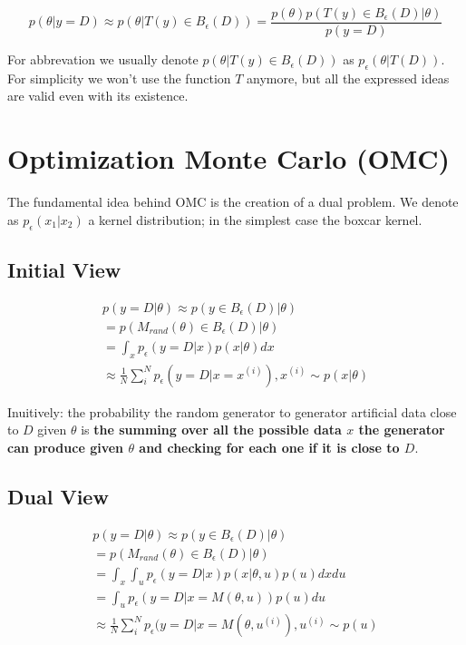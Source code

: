 \documentclass{article}
\begin{document}
\begin{equation} \label{eq:summary_stat}
    p(\theta|y=D) \approx p(\theta|T(y) \in B_\epsilon(D)) = \frac{p(\theta) p(T(y) \in B_\epsilon(D)|\theta)}{p(y=D)}
\end{equation}

For abbrevation we usually denote $p(\theta|T(y) \in B_\epsilon(D))$ as $p_\epsilon(\theta|T(D))$. For simplicity we won't use the function $T$ anymore, but all the expressed ideas are valid even with its existence.


\section{Optimization Monte Carlo (OMC)}

The fundamental idea behind OMC is the creation of a dual problem. We denote as $p_\epsilon(x_1|x_2)$ a kernel distribution; in the simplest case the boxcar kernel. 

\subsection*{Initial View}

\begin{gather} \label{eq:init_view}
  p(y=D|\theta) \approx p(y \in B_\epsilon (D)|\theta) \\
  = p(M_{rand}(\theta) \in B_\epsilon (D)|\theta)\\
  = \int_x p_\epsilon(y=D|x)p(x|\theta)dx \\
  \approx \frac{1}{N} \sum_i^N p_\epsilon (y=D|x=x^{(i)}), x^{(i)} \sim p(x|\theta)
\end{gather}

Inuitively: the probability the random generator to generator artificial data close to $D$ given $\theta$ is \textbf{the summing over all the possible data $x$ the generator can produce given $\theta$ and checking for each one if it is close to $D$}.

\subsection*{Dual View}

\begin{gather} \label{eq:dual_view}
  p(y=D|\theta) \approx p(y \in B_\epsilon (D)|\theta) \\
  = p(M_{rand}(\theta) \in B_\epsilon (D)|\theta)\\
  = \int_x \int_u p_\epsilon(y=D|x)p(x|\theta, u) p(u)dxdu \\
  = \int_u p_\epsilon(y=D|x=M(\theta, u)) p(u)du \\
  \approx \frac{1}{N} \sum_i^N p_\epsilon (y=D|x=M(\theta, u^{(i)}), u^{(i)} \sim p(u)  
\end{gather}
\end{document}
